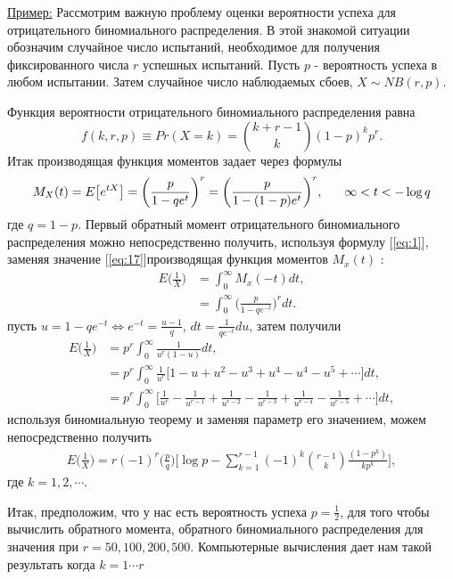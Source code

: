 \documentclass[13pt]{article}
\begin{document}
\underline{Пример:}
Рассмотрим важную проблему оценки вероятности успеха для отрицательного биномиального распределения. В этой знакомой ситуации обозначим случайное число испытаний, необходимое для получения фиксированного числа $r$ успешных испытаний. Пусть $p$ - вероятность успеха в любом испытании. Затем случайное число наблюдаемых сбоев, $X \sim NB(r,p)$. \par 
Функция вероятности отрицательного биномиального распределения равна
\begin{equation*}
    f(k, r, p) \equiv Pr(X=k)= \binom{k+r-1}{k}(1-p)^{k}p^{r}.
\end{equation*}
Итак производящая функция моментов задает через формулы
\begin{equation}\label{eq:17}
    M_{X}(t) = E\big[e^{tX}\big] = \bigg(\frac{p}{1-qe^{t}}\bigg)^{r} =\bigg(\frac{p}{1-(1-p)e^{t}}\bigg)^{r} , \hspace{6 mm} \infty<t <-\log q
\end{equation}
где $q = 1 - p$. Первый обратный момент отрицательного биномиального распределения можно непосредственно получить, используя формулу [\ref{eq:1}], заменяя значение [\ref{eq:17}]производящая функция моментов $M_{x}(t)$  :
\begin{align*}
    E\bigg(\frac{1}{X}\bigg) &= \int_{0}^{\infty} M_{x}(-t)dt ,\\
    &= \int_{0}^{\infty} \bigg(\frac{p}{1-qe^{-t}}\bigg)^{r}dt.
\end{align*}
пусть $u=1-qe^{-t} \Longleftrightarrow e^{-t}=\frac{u-1}{q}$, $dt = \frac{1}{qe^{-t}}du$,  затем получили
\begin{align*}
    E\bigg(\frac{1}{X}\bigg) &= p^{r} \int_{0}^{\infty} \frac{1}{u^{r}(1-u)}dt,\\
    &=p^{r} \int_{0}^{\infty} \frac{1}{u^{r}}\bigg[1-u+u^{2}-u^{3}+u^{4}-u^{4}-u^{5}+\cdots \bigg]dt,\\
    &=p^{r} \int_{0}^{\infty} \bigg[\frac{1}{u^r}-\frac{1}{u^{r-1}}+\frac{1}{u^{r-2}}-\frac{1}{u^{r-3}}+\frac{1}{u^{r-4}}-\frac{1}{u^{r-5}}+ \cdots \bigg]dt ,
\end{align*}
используя биномиальную теорему и заменяя параметр его значением, можем непосредственно получить
\begin{align*}
 E\bigg(\frac{1}{X}\bigg) = r(-1)^{r}\bigg(\frac{p}{q}\bigg)\bigg[\log p - \sum_{k=1}^{r-1}(-1)^{k}\binom{r-1}{k}\frac{(1-p^{k})}{k p^{k}} \bigg],
\end{align*}
где $k=1,2,\cdots$.

Итак, предположим, что у нас есть вероятность успеха $p=\frac{1}{2}$, для того чтобы вычислить обратного момента, обратного биномиального распределения для значения при $r=50, 100, 200, 500$. Компьютерные  вычисления дает нам такой результать когда $k =  1 \cdots r$
\vspace{10mm}
\end{document}
